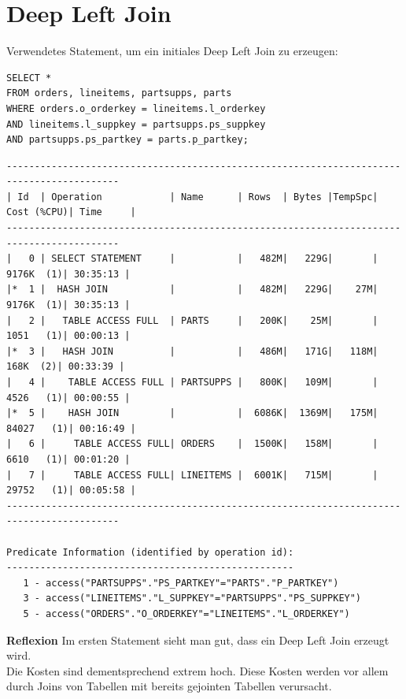 \documentclass[10pt]{article}
\begin{document}
\newpage
\section{Deep Left Join}
Verwendetes Statement, um ein initiales Deep Left Join zu erzeugen:
\begin{lstlisting}[style=sql]
SELECT *
FROM orders, lineitems, partsupps, parts
WHERE orders.o_orderkey = lineitems.l_orderkey
AND lineitems.l_suppkey = partsupps.ps_suppkey
AND partsupps.ps_partkey = parts.p_partkey;
\end{lstlisting}
\begin{lstlisting}[style=queryexecutionplan]
------------------------------------------------------------------------------------------
| Id  | Operation            | Name      | Rows  | Bytes |TempSpc| Cost (%CPU)| Time     |
------------------------------------------------------------------------------------------
|   0 | SELECT STATEMENT     |           |   482M|   229G|       |  9176K  (1)| 30:35:13 |
|*  1 |  HASH JOIN           |           |   482M|   229G|    27M|  9176K  (1)| 30:35:13 |
|   2 |   TABLE ACCESS FULL  | PARTS     |   200K|    25M|       |  1051   (1)| 00:00:13 |
|*  3 |   HASH JOIN          |           |   486M|   171G|   118M|   168K  (2)| 00:33:39 |
|   4 |    TABLE ACCESS FULL | PARTSUPPS |   800K|   109M|       |  4526   (1)| 00:00:55 |
|*  5 |    HASH JOIN         |           |  6086K|  1369M|   175M| 84027   (1)| 00:16:49 |
|   6 |     TABLE ACCESS FULL| ORDERS    |  1500K|   158M|       |  6610   (1)| 00:01:20 |
|   7 |     TABLE ACCESS FULL| LINEITEMS |  6001K|   715M|       | 29752   (1)| 00:05:58 |
------------------------------------------------------------------------------------------

Predicate Information (identified by operation id):
---------------------------------------------------
   1 - access("PARTSUPPS"."PS_PARTKEY"="PARTS"."P_PARTKEY")
   3 - access("LINEITEMS"."L_SUPPKEY"="PARTSUPPS"."PS_SUPPKEY")
   5 - access("ORDERS"."O_ORDERKEY"="LINEITEMS"."L_ORDERKEY")
\end{lstlisting}
\textbf{Reflexion} \newline
Im ersten Statement sieht man gut, dass ein Deep Left Join erzeugt wird.\\
Die Kosten sind dementsprechend extrem hoch. Diese Kosten werden vor allem durch Joins von Tabellen mit bereits gejointen Tabellen verursacht.
\end{document}
